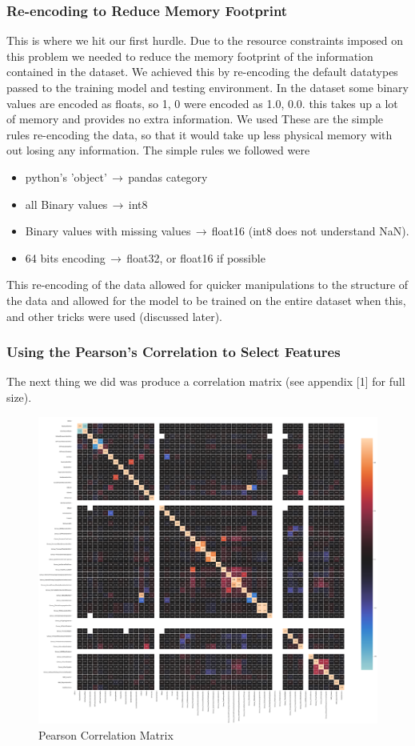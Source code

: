 \documentclass[sigconf]{acmart}
\begin{document}
\subsubsection{Re-encoding to Reduce Memory Footprint}
This is where we hit our first hurdle. Due to the resource constraints imposed on this problem we needed to reduce the memory footprint of the information contained in the dataset. We achieved this by re-encoding the default datatypes passed to the training model and testing environment. In the dataset some binary values are encoded as floats, so 1, 0 were encoded as 1.0, 0.0. this takes up a lot of memory and provides no extra information. We used These are the simple rules re-encoding the data, so that it would take up less physical memory with out losing any information. The simple rules we followed were
\begin{itemize}
\item python's 'object'$\,\to\,$pandas category
\item all Binary values$\,\to\,$int8
\item Binary values with missing values$\,\to\,$float16 (int8 does not understand NaN).
\item 64 bits encoding$\,\to\,$float32, or float16 if possible
\end{itemize}

This re-encoding of the data allowed for quicker manipulations to the structure of the data and allowed for the model to be trained on the entire dataset when this, and other tricks were used (discussed later). 
 \subsubsection{Using the Pearson's Correlation to Select Features}
 The next thing we did was produce a correlation matrix (see appendix [1] for full size). 
 \begin{figure}
  \includegraphics[width=\linewidth]{correlation.PNG}
  \caption{Pearson Correlation Matrix}
  \label{fig:matrix}
\end{figure}
\end{document}

